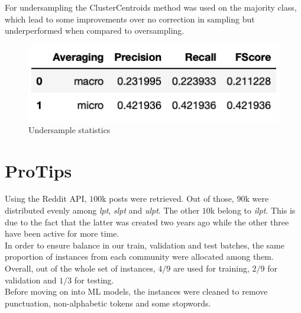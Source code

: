 \documentclass[11pt,a4paper]{article}
\begin{document}
For undersampling the ClusterCentroids method was used on the majority class, which lead to some improvements over no correction in sampling but underperformed when compared to oversampling. 
\begin{figure}[h!] %
	\center
	\includegraphics[scale=0.5]{undersample.png}
	\caption{Undersample statistics}
\end{figure}


\section{ProTips}
\label{sec:protips}
Using the Reddit API, $100$k posts were retrieved. Out of those, $90$k were distributed
evenly among \textit{lpt}, \textit{slpt} and \textit{ulpt}. The other $10$k belong to
\textit{ilpt}. This is due to the fact that the latter was created two years ago
while the other three have been active for more time.\\
In order to ensure balance in our train, validation and test batches, the same proportion
of instances from each community were allocated among them.\\
Overall, out of the whole set of instances, $4/9$ are used for training, $2/9$ for
validation and $1/3$ for testing.\\
Before moving on into ML models, the instances were cleaned to remove punctuation,
non-alphabetic tokens and some stopwords.\\
\end{document}
